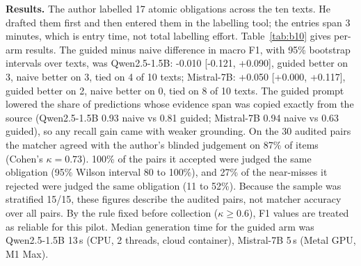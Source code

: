 \begin{table}[t]\centering\small
\caption{B10 pilot by model and condition (10 texts, 3 seeds each). F1 is requirement-level, averaged within text then across texts.}\label{tab:b10}
\end{table}

\textbf{Results.} The author labelled 17 atomic obligations across the ten texts. He drafted them first and then entered them in the labelling tool; the entries span 3 minutes, which is entry time, not total labelling effort. Table~\ref{tab:b10} gives per-arm results. The guided minus naive difference in macro F1, with 95\% bootstrap intervals over texts, was Qwen2.5-1.5B: -0.010 [-0.121, +0.090], guided better on 3, naive better on 3, tied on 4 of 10 texts; Mistral-7B: +0.050 [+0.000, +0.117], guided better on 2, naive better on 0, tied on 8 of 10 texts. The guided prompt lowered the share of predictions whose evidence span was copied exactly from the source (Qwen2.5-1.5B 0.93 naive vs 0.81 guided; Mistral-7B 0.94 naive vs 0.63 guided), so any recall gain came with weaker grounding. On the 30 audited pairs the matcher agreed with the author's blinded judgement on 87\% of items (Cohen's $\kappa=0.73$). 100\% of the pairs it accepted were judged the same obligation (95\% Wilson interval 80 to 100\%), and 27\% of the near-misses it rejected were judged the same obligation (11 to 52\%). Because the sample was stratified 15/15, these figures describe the audited pairs, not matcher accuracy over all pairs. By the rule fixed before collection ($\kappa\geq0.6$), F1 values are treated as reliable for this pilot. Median generation time for the guided arm was Qwen2.5-1.5B 13\,s (CPU, 2 threads, cloud container), Mistral-7B 5\,s (Metal GPU, M1 Max).%
